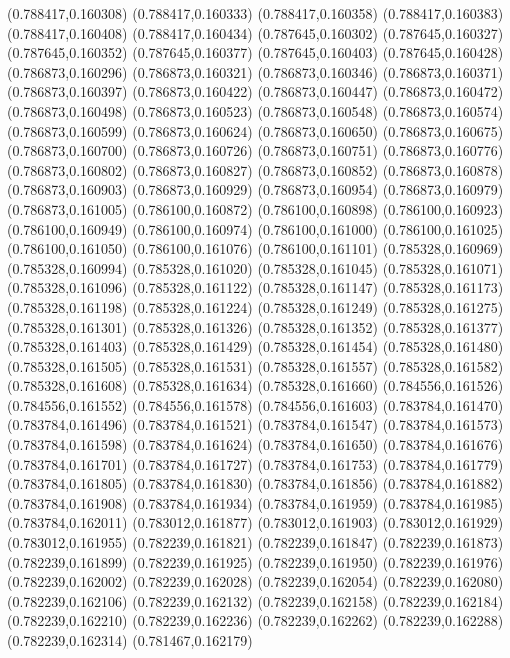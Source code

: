 (0.788417,0.160308)
(0.788417,0.160333)
(0.788417,0.160358)
(0.788417,0.160383)
(0.788417,0.160408)
(0.788417,0.160434)
(0.787645,0.160302)
(0.787645,0.160327)
(0.787645,0.160352)
(0.787645,0.160377)
(0.787645,0.160403)
(0.787645,0.160428)
(0.786873,0.160296)
(0.786873,0.160321)
(0.786873,0.160346)
(0.786873,0.160371)
(0.786873,0.160397)
(0.786873,0.160422)
(0.786873,0.160447)
(0.786873,0.160472)
(0.786873,0.160498)
(0.786873,0.160523)
(0.786873,0.160548)
(0.786873,0.160574)
(0.786873,0.160599)
(0.786873,0.160624)
(0.786873,0.160650)
(0.786873,0.160675)
(0.786873,0.160700)
(0.786873,0.160726)
(0.786873,0.160751)
(0.786873,0.160776)
(0.786873,0.160802)
(0.786873,0.160827)
(0.786873,0.160852)
(0.786873,0.160878)
(0.786873,0.160903)
(0.786873,0.160929)
(0.786873,0.160954)
(0.786873,0.160979)
(0.786873,0.161005)
(0.786100,0.160872)
(0.786100,0.160898)
(0.786100,0.160923)
(0.786100,0.160949)
(0.786100,0.160974)
(0.786100,0.161000)
(0.786100,0.161025)
(0.786100,0.161050)
(0.786100,0.161076)
(0.786100,0.161101)
(0.785328,0.160969)
(0.785328,0.160994)
(0.785328,0.161020)
(0.785328,0.161045)
(0.785328,0.161071)
(0.785328,0.161096)
(0.785328,0.161122)
(0.785328,0.161147)
(0.785328,0.161173)
(0.785328,0.161198)
(0.785328,0.161224)
(0.785328,0.161249)
(0.785328,0.161275)
(0.785328,0.161301)
(0.785328,0.161326)
(0.785328,0.161352)
(0.785328,0.161377)
(0.785328,0.161403)
(0.785328,0.161429)
(0.785328,0.161454)
(0.785328,0.161480)
(0.785328,0.161505)
(0.785328,0.161531)
(0.785328,0.161557)
(0.785328,0.161582)
(0.785328,0.161608)
(0.785328,0.161634)
(0.785328,0.161660)
(0.784556,0.161526)
(0.784556,0.161552)
(0.784556,0.161578)
(0.784556,0.161603)
(0.783784,0.161470)
(0.783784,0.161496)
(0.783784,0.161521)
(0.783784,0.161547)
(0.783784,0.161573)
(0.783784,0.161598)
(0.783784,0.161624)
(0.783784,0.161650)
(0.783784,0.161676)
(0.783784,0.161701)
(0.783784,0.161727)
(0.783784,0.161753)
(0.783784,0.161779)
(0.783784,0.161805)
(0.783784,0.161830)
(0.783784,0.161856)
(0.783784,0.161882)
(0.783784,0.161908)
(0.783784,0.161934)
(0.783784,0.161959)
(0.783784,0.161985)
(0.783784,0.162011)
(0.783012,0.161877)
(0.783012,0.161903)
(0.783012,0.161929)
(0.783012,0.161955)
(0.782239,0.161821)
(0.782239,0.161847)
(0.782239,0.161873)
(0.782239,0.161899)
(0.782239,0.161925)
(0.782239,0.161950)
(0.782239,0.161976)
(0.782239,0.162002)
(0.782239,0.162028)
(0.782239,0.162054)
(0.782239,0.162080)
(0.782239,0.162106)
(0.782239,0.162132)
(0.782239,0.162158)
(0.782239,0.162184)
(0.782239,0.162210)
(0.782239,0.162236)
(0.782239,0.162262)
(0.782239,0.162288)
(0.782239,0.162314)
(0.781467,0.162179)

